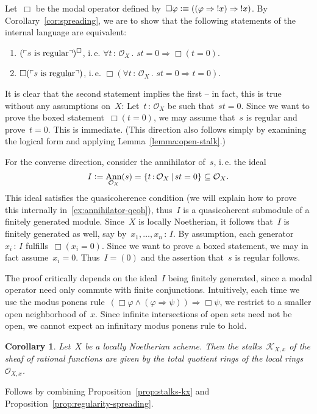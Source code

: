 \documentclass[10pt,reqno,a4paper]{amsbook}
\makeatletter
\theoremstyle{definition}
\theoremstyle{plain}
\newtheorem{cor}[defn]{Corollary}
\theoremstyle{remark}
\renewcommand{\O}{\mathcal{O}}
\newcommand{\K}{\mathcal{K}}
\DeclareMathOperator{\Ann}{Ann}
\newcommand{\?}{\,{:}\,}
\renewcommand{\_}{\mathpunct{.}\,}
\newcommand{\speak}[1]{\ulcorner\text{\textnormal{#1}}\urcorner}
\newcommand{\ie}{i.\,e.\@\xspace}
\newcommand{\defeq}{\vcentcolon=}
\newcommand{\defequiv}{\vcentcolon\equiv}
\renewenvironment{proof}[1][\proofname]{\par
  \pushQED{\qed}%
  \normalfont \topsep6\p@\@plus6\p@\relax
  \trivlist
  \item[\hskip\labelsep
        \itshape
    #1\@addpunct{.}]\ignorespaces
}{%
  \popQED\endtrivlist\@endpefalse
}
\makeatother
\begin{document}
\begin{proof}
Let~$\Box$ be the modal operator defined by~$\Box\varphi \defequiv ((\varphi
\Rightarrow {!x}) \Rightarrow {!x})$. By Corollary~\ref{cor:spreading}, we are
to show that the following statements of the internal language are equivalent:
\begin{enumerate}
\item $(\speak{$s$ is regular})^\Box$, \ie
$\forall t\?\O_X\_ st = 0 \Rightarrow \Box(t = 0)$.
\item $\Box(\speak{$s$ is regular})$, \ie
$\Box(\forall t\?\O_X\_ st = 0 \Rightarrow t = 0)$.
\end{enumerate}
It is clear that the second statement implies the first -- in fact, this is true
without any assumptions on~$X$: Let~$t\?\O_X$ be such that~$st = 0$. Since we want to
prove the boxed statement~$\Box(t=0)$, we may assume that~$s$ is regular and
prove~$t = 0$. This is immediate. (This direction also follows simply by
examining the logical form and applying Lemma~\ref{lemma:open-stalk}.)

For the converse direction, consider the annihilator of~$s$, \ie the ideal
\[ I \defeq \Ann_{\O_X}(s) = \{ t\?\O_X \,|\, st = 0 \} \subseteq \O_X. \]
This ideal satisfies the quasicoherence condition (we will explain how to prove this internally in~\ref{ex:annihilator-qcoh}),
thus~$I$ is a quasicoherent submodule of a finitely generated module. Since~$X$ is
locally Noetherian, it follows that~$I$ is finitely generated as well, say by~$x_1,\ldots,x_n \? I$. By
assumption, each generator~$x_i \? I$ fulfills~$\Box(x_i = 0)$. Since we want
to prove a boxed statement, we may in fact assume~$x_i = 0$. Thus~$I = (0)$ and
the assertion that~$s$ is regular follows.
\end{proof}

The proof critically depends on the ideal~$I$ being finitely
generated, since a modal operator need only commute with finite
conjunctions. Intuitively, each time we use the modus ponens rule~$(\Box\varphi \wedge
(\varphi \Rightarrow \psi)) \Rightarrow \Box\psi$, we restrict to a smaller open
neighborhood of~$x$. Since infinite intersections of open sets need not be
open, we cannot expect an infinitary modus ponens rule to hold.

\begin{cor}Let~$X$ be a locally Noetherian scheme. Then the stalks~$\K_{X,x}$
of the sheaf of rational functions are given by the total quotient rings of the
local rings~$\O_{X,x}$.\end{cor}
\begin{proof}Follows by combining Proposition~\ref{prop:stalks-kx} and
Proposition~\ref{prop:regularity-spreading}.\end{proof}
\end{document}
